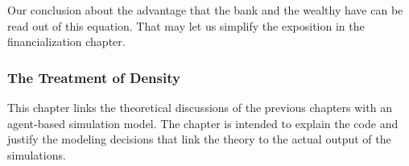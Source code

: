 Our conclusion about the advantage that the bank and the wealthy have can be read out of this equation. 
That may let us simplify the exposition in the financialization chapter.




\subsubsection{The Treatment of Density}

\newpage
This chapter links the theoretical discussions of the previous chapters with an agent-based simulation model. The chapter is intended to explain the code and justify the modeling decisions that link the theory to the actual output of the simulations.